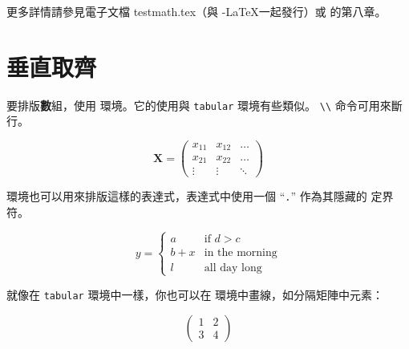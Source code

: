 
更多詳情請參見電子文檔 testmath.tex（與 \AmS-\LaTeX 一起發行）或 \companion{} 的第八章。
\section{垂直取齊}
\label{sec:vert}


要排版{\textbf
數組}，使用  環境。它的使用與 \texttt{tabular} 環境有些類似。 \verb|\\| 命令可用來斷行。


\begin{example}
\begin{displaymath}
\mathbf{X} =
\left( \begin{array}{ccc}
x_{11} & x_{12} & \ldots \\
x_{21} & x_{22} & \ldots \\
\vdots & \vdots & \ddots
\end{array} \right)
\end{displaymath}
\end{example}

 環境也可以用來排版這樣的表達式，表達式中使用一個 ``\verb|.|'' 作為其隱藏的  定界符。

\begin{example}
\begin{displaymath}
y = \left\{ \begin{array}{ll}
 a & \textrm{if $d>c$}\\
 b+x & \textrm{in the morning}\\
 l & \textrm{all day long}
  \end{array} \right.
\end{displaymath}
\end{example}

就像在 \verb|tabular| 環境中一樣，你也可以在  環境中畫線，如分隔矩陣中元素：
\begin{example}
\begin{displaymath}
\left(\begin{array}{c|c}
 1 & 2 \\
\hline
3 & 4
\end{array}\right)
\end{displaymath}
\end{example}



